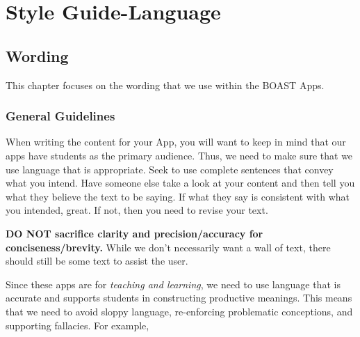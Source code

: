 \documentclass[
]{book}
\begin{document}
\hypertarget{part-style-guide-language}{%
\part{Style Guide-Language}\label{part-style-guide-language}}

\hypertarget{wording}{%
\chapter{Wording}\label{wording}}

This chapter focuses on the wording that we use within the BOAST Apps.

\hypertarget{general-guidelines}{%
\section{General Guidelines}\label{general-guidelines}}

When writing the content for your App, you will want to keep in mind that our apps have students as the primary audience. Thus, we need to make sure that we use language that is appropriate. Seek to use complete sentences that convey what you intend. Have someone else take a look at your content and then tell you what they believe the text to be saying. If what they say is consistent with what you intended, great. If not, then you need to revise your text.

\textbf{DO NOT sacrifice clarity and precision/accuracy for
conciseness/brevity.} While we don't necessarily want a wall of text, there should still be some text to assist the user.

Since these apps are for \emph{teaching and learning}, we need to use language that is accurate and supports students in constructing productive meanings. This means that we need to avoid sloppy language, re-enforcing problematic conceptions, and supporting fallacies. For example,
\end{document}
